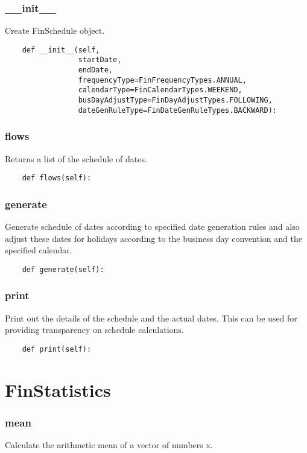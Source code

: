 \documentclass[twoside,11pt]{book}
\begin{document}
\subsubsection*{{\bf \_\_init\_\_}}
Create FinSchedule object.  

\begin{lstlisting}
    def __init__(self,
                 startDate,
                 endDate,
                 frequencyType=FinFrequencyTypes.ANNUAL,
                 calendarType=FinCalendarTypes.WEEKEND,
                 busDayAdjustType=FinDayAdjustTypes.FOLLOWING,
                 dateGenRuleType=FinDateGenRuleTypes.BACKWARD):
\end{lstlisting}

\subsubsection*{{\bf flows}}
Returns a list of the schedule of dates.  

\begin{lstlisting}
    def flows(self):
\end{lstlisting}

\subsubsection*{{\bf generate}}
Generate schedule of dates according to specified date generation rules and also adjust these dates for holidays according to the business day convention and the specified calendar.  

\begin{lstlisting}
    def generate(self):
\end{lstlisting}

\subsubsection*{{\bf print}}
Print out the details of the schedule and the actual dates. This can be used for providing transparency on schedule calculations.  

\begin{lstlisting}
    def print(self):
\end{lstlisting}

\newpage
\section{FinStatistics}

\subsubsection*{{\bf mean}}
Calculate the arithmetic mean of a vector of numbers x.  
\end{document}
